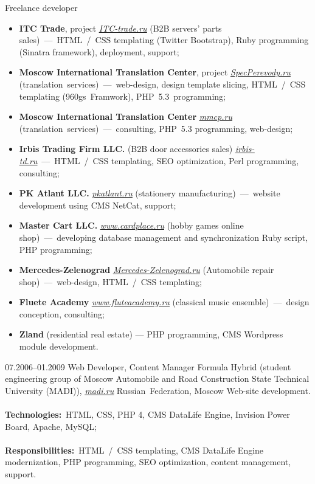 \documentclass[12pt,a4paper,final]{moderncv}
\begin{document}
{Freelance developer}{}{}{}{
\begin{itemize}
  \item \textbf{ITC Trade}, project \underline{\href{http://itc-trade.ru}{\itshape ITC-trade.ru}} (B2B servers' parts sales)~---~HTML~/~CSS templating (Twitter Bootstrap), Ruby programming (Sinatra framework), deployment, support;
  \item \textbf{Moscow International Translation Center}, project \underline{\href{http://specperevody.ru}{\itshape SpecPerevody.ru}} (translation~services)~---~web-design, design template slicing, HTML~/~CSS templating (960gs~Framwork), PHP~5.3~programming;
  \item \textbf{Moscow International Translation Center} \underline{\href{http://mmcp.ru}{\itshape mmcp.ru}} (translation~services)~---~consulting, PHP~5.3 programming, web-design;
  \item \textbf{Irbis Trading Firm LLC.} (B2B door accessories sales) \underline{\href{http://irbis-td.ru}{\itshape irbis-td.ru}}~---~HTML~/~CSS templating, SEO optimization, Perl programming, consulting;
  \item \textbf{PK Atlant LLC.} \underline{\href{http://pkatlant.ru}{\itshape pkatlant.ru}} (stationery manufacturing)~---~website development using CMS NetCat, support;
  \item \textbf{Master Cart LLC.} \underline{\href{http://www.cardplace.ru}{\itshape www.cardplace.ru}} (hobby games online shop)~---~developing database management and synchronization Ruby script, PHP programming;
  \item \textbf{Mercedes-Zelenograd} \underline{\href{http://mercedes-zelenograd.ru}{\itshape Mercedes-Zelenograd.ru}} (Automobile repair shop)~---~web-design, HTML~/~CSS templating;
  \item \textbf{Fluete Academy} \underline{\href{http://www.fluteacademy.ru}{\itshape www.fluteacademy.ru}} (classical music ensemble)~---~design conception, consulting;
  \item \textbf{Zland} (residential real estate) --- PHP programming, CMS Wordpress module development.
\end{itemize}}
%
\cventry
{07.2006--01.2009}
{Web Developer, Content Manager}
{
  Formula Hybrid (student engineering group of Moscow Automobile and Road Construction State Technical University (MADI)), \underline{\href{http://madi.ru}{\itshape madi.ru}}
}
{Russian~Federation, Moscow}
{}
{
  Web-site development.
  \\\\
  \textbf{Technologies:}~HTML, CSS, PHP 4, CMS DataLife Engine, Invision Power Board, Apache, MySQL;
  \\\\
  \textbf{Responsibilities:}~HTML~/~CSS templating, CMS DataLife Engine modernization, PHP programming, SEO optimization, content management, support.
}
\end{document}
